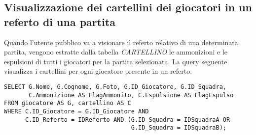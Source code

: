 \subsection*{Visualizzazione dei cartellini dei giocatori in un referto di una partita}
Quando l'utente pubblico va a visionare il referto relativo di una determinata partita, vengono estratte dalla tabella \emph{CARTELLINO} le ammonizioni e le espulsioni di tutti i giocatori per la partita selezionata. La query seguente visualizza i cartellini per ogni giocatore presente in un referto:

\begin{lstlisting}
SELECT G.Nome, G.Cognome, G.Foto, G.ID_Giocatore, G.ID_Squadra,
       C.Ammonizione AS FlagAmmonito, C.Espulsione AS FlagEspulso
FROM giocatore AS G, cartellino AS C
WHERE C.ID_Giocatore = G.ID_Giocatore AND
      C.ID_Referto = IDReferto AND (G.ID_Squadra = IDSquadraA OR
                                    G.ID_Squadra = IDSquadraB);
\end{lstlisting}